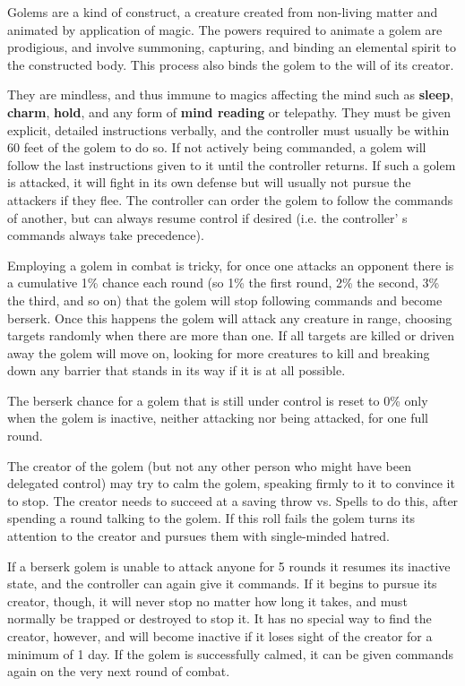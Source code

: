 \documentclass[a4paper,twoside,openany,10pt]{book}
\begin{document}
\begin{multicols}{2}
Golems are a kind of construct, a creature created from non-living matter and animated by application of magic. The powers required to animate a golem are prodigious, and involve summoning, capturing, and binding an elemental spirit to the constructed body. This process also binds the golem to the will of its creator.

They are mindless, and thus immune to magics affecting the mind such as \textbf{sleep}, \textbf{charm}, \textbf{hold}, and any form of \textbf{mind reading} or telepathy. They must be given explicit, detailed instructions verbally, and the controller must usually be within 60 feet of the golem to do so. If not actively being commanded, a golem will follow the last instructions given to it until the controller returns. If such a golem is attacked, it will fight in its own defense but will usually not pursue the attackers if they flee. The controller can order the golem to follow the commands of another, but can always resume control if desired (i.e. the controller' s commands always take precedence).

Employing a golem in combat is tricky, for once one attacks an opponent there is a cumulative 1\% chance each round (so 1\% the first round, 2\% the second, 3\% the third, and so on) that the golem will stop following commands and become berserk. Once this happens the golem will attack any creature in range, choosing targets randomly when there are more than one. If all targets are killed or driven away the golem will move on, looking for more creatures to kill and breaking down any barrier that stands in its way if it is at all possible. 

The berserk chance for a golem that is still under control is reset to 0\% only when the golem is inactive, neither attacking nor being attacked, for one full round.

The creator of the golem (but not any other person who might have been delegated control) may try to calm the golem, speaking firmly to it to convince it to stop. The creator needs to succeed at a saving throw vs. Spells to do this, after spending a round talking to the golem. If this roll fails the golem turns its attention to the creator and pursues them with single-minded hatred.

If a berserk golem is unable to attack anyone for 5 rounds it resumes its inactive state, and the controller can again give it commands. If it begins to pursue its creator, though, it will never stop no matter how long it takes, and must normally be trapped or destroyed to stop it. It has no special way to find the creator, however, and will become inactive if it loses sight of the creator for a minimum of 1 day. If the golem is successfully calmed, it can be given commands again on the very next round of combat.


\end{multicols}
\end{document}
